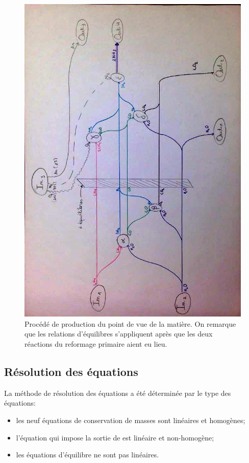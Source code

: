 \documentclass[a4paper,12pt]{article}
\begin{document}
\begin{figure}
    \centering
    \includegraphics[width=.9\textwidth]{flows_matter}
    \caption{
        Procédé de production du point de vue de la matière.
        On remarque que les relations d'équilibres s'appliquent après que les deux
        réactions du reformage primaire aient eu lieu.
    }
    \label{fig:flows-matter}
\end{figure}

\subsection{Résolution des équations}

La méthode de résolution des équations a été déterminée par le type des équations:
\begin{itemize}
    \item les neuf équations de conservation de masses sont linéaires et homogènes;
    \item l'équation qui impose la sortie de  est linéaire et non-homogène;
    \item les équations d'équilibre ne sont pas linéaires.
\end{itemize}
\end{document}
